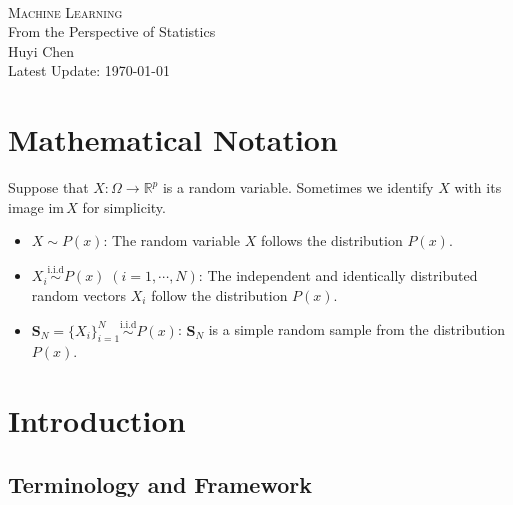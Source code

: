 \documentclass{report}
\theoremstyle{nonumberplain}
\newcommand{\0}{\mathbf{0}}
\begin{document}
	\begin{center}	
	~\\ 
	\vspace{6em} 
	\textsc{\Huge Machine Learning}	
	~\\
	\vspace{2.5em} 
	{\Large From the Perspective of Statistics}
	~\\
	\vspace{6em}
	\textsf{Huyi Chen}
	~\\
	\vspace{5in}  
	{\large Latest Update: \today}
	\end{center}


\chapter*{Mathematical Notation}
	Suppose that $X:\Omega\to\mathbb{R}^p$ is a random variable. Sometimes we identify $X$ with its image $\mathrm{im}\,X$ for simplicity.
\begin{itemize}
	\item $X\sim P(x)$: The random variable $X$ follows the distribution $P(x)$.
	\item $X_i\stackrel{\text{i.i.d}}{\sim}P(x)\;(i=1,\cdots,N)$: The independent and identically distributed random vectors $X_i$ follow the distribution $P(x)$. \item $\mathbf{S}_N=\{X_i\}_{i=1}^N\stackrel{\text{i.i.d}}{\sim}P(x)$: $\mathbf{S}_N$ is a simple random sample from the distribution $P(x)$.
\end{itemize}
\chapter{Introduction}

\section{Terminology and Framework}
\end{document}

